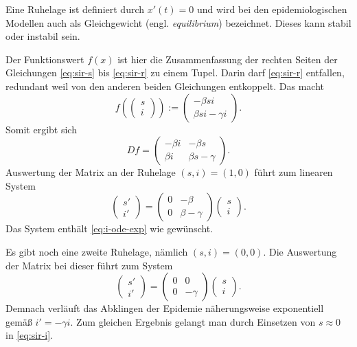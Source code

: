 \documentclass[a4paper,10pt,fleqn,twocolumn,twoside,dvipdfmx]{scrartcl}
\numberwithin{equation}{section}
\begin{document}
Eine Ruhelage ist definiert durch $x'(t)=0$ und wird bei den
epidemiologischen Modellen auch als Gleichgewicht (engl.
\emph{equilibrium}) bezeichnet. Dieses kann stabil oder instabil sein.

Der Funktionswert $f(x)$ ist hier die Zusammenfassung der rechten
Seiten der Gleichungen \eqref{eq:sir-s} bis \eqref{eq:sir-r} zu einem
Tupel. Darin darf \eqref{eq:sir-r} entfallen, redundant weil von
den anderen beiden Gleichungen entkoppelt. Das macht%
\begin{equation}
f(\begin{pmatrix}s\\ i\end{pmatrix})
:= \begin{pmatrix}-\beta s i\\ \beta si - \gamma i\end{pmatrix}.
\end{equation}
Somit ergibt sich
\begin{equation}
Df = \begin{pmatrix}
-\beta i & -\beta s\\
\beta i & \beta s - \gamma
\end{pmatrix}.
\end{equation}
Auswertung der Matrix an der Ruhelage $(s,i)=(1,0)$ führt zum linearen
System%
\begin{equation}
\begin{pmatrix}
s'\\ i'
\end{pmatrix}
= \begin{pmatrix}
0 & -\beta\\
0 & \beta-\gamma
\end{pmatrix}
\begin{pmatrix}
s\\ i
\end{pmatrix}.
\end{equation}
Das System enthält \eqref{eq:i-ode-exp} wie gewünscht.

Es gibt noch eine zweite Ruhelage, nämlich $(s,i)=(0,0)$. Die
Auswertung der Matrix bei dieser führt zum System
\begin{equation}
\begin{pmatrix}
s'\\ i'
\end{pmatrix}
= \begin{pmatrix}
0 & 0\\
0 & -\gamma
\end{pmatrix}
\begin{pmatrix}
s\\ i
\end{pmatrix}.
\end{equation}
Demnach verläuft das Abklingen der Epidemie näherungsweise exponentiell
gemäß $i' = -\gamma i$. Zum gleichen Ergebnis gelangt man durch
Einsetzen von $s\approx 0$ in \eqref{eq:sir-i}.
\end{document}
